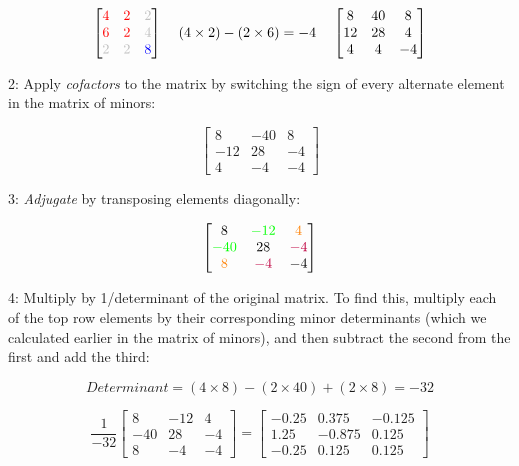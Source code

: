 \documentclass[11pt]{article}
\begin{document}
\begin{equation}\begin{bmatrix}\color{red}4 & \color{red}2 & \color{lightgray}2\\\color{red}6 & \color{red}2 & \color{lightgray}4\\\color{lightgray}2 & \color{lightgray}2 & \color{blue}8\end{bmatrix}\;\;\;\;(4\times2) - (2\times6) = -4\;\;\;\;\begin{bmatrix}8 & 40 & 8\\12 & 28 & 4\\4 & 4 & -4\end{bmatrix} \end{equation}

2: Apply \emph{cofactors} to the matrix by switching the sign of every
alternate element in the matrix of minors:

\begin{equation}\begin{bmatrix}8 & -40 & 8\\-12 & 28 & -4\\4 & -4 & -4\end{bmatrix} \end{equation}

3: \emph{Adjugate} by transposing elements diagonally:

\begin{equation}\begin{bmatrix}8 & \color{green}-\color{green}1\color{green}2 & \color{orange}4\\\color{green}-\color{green}4\color{green}0 & 28 & \color{purple}-\color{purple}4\\\color{orange}8 & \color{purple}-\color{purple}4 & -4\end{bmatrix} \end{equation}

4: Multiply by 1/determinant of the original matrix. To find this,
multiply each of the top row elements by their corresponding minor
determinants (which we calculated earlier in the matrix of minors), and
then subtract the second from the first and add the third:

\begin{equation}Determinant = (4 \times 8) - (2 \times 40) + (2 \times 8) = -32\end{equation}

\begin{equation}\frac{1}{-32}\begin{bmatrix}8 & -12 & 4\\-40 & 28 & -4\\8 & -4 & -4\end{bmatrix} =  \begin{bmatrix}-0.25 & 0.375 & -0.125\\1.25 & -0.875 & 0.125\\-0.25 & 0.125 & 0.125\end{bmatrix}\end{equation}
\end{document}
